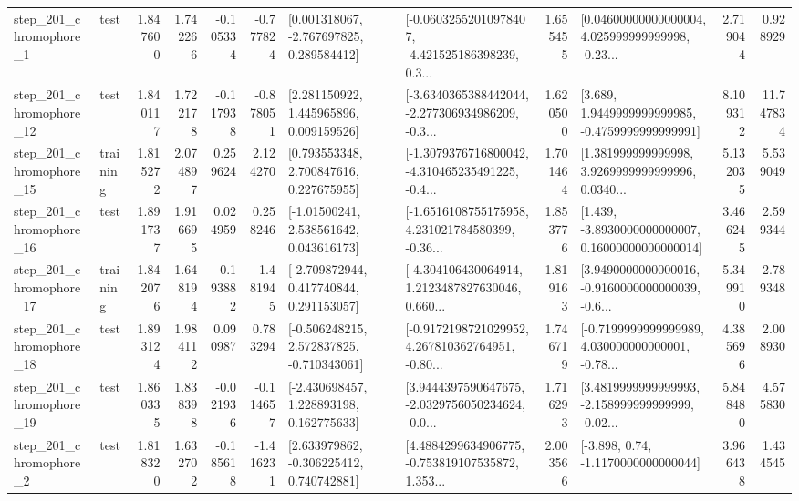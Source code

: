 \begin{tabular}{llrrrrllrlrr}
   step\_201\_chromophore\_1 &      test &      1.847600 &    1.742266 &     -0.105334 & -0.777824 &    [0.001318067, -2.767697825, 0.289584412] &  [-0.06032552010978407, -4.421525186398239, 0.3... &       1.655455 &  [0.04600000000000004, 4.025999999999998, -0.23... &            2.719044 &          0.928929 \\
  step\_201\_chromophore\_12 &      test &      1.840117 &    1.722178 &     -0.117938 & -0.878051 &     [2.281150922, 1.445965896, 0.009159526] &  [-3.6340365388442044, -2.277306934986209, -0.3... &       1.620500 &   [3.689, 1.9449999999999985, -0.4759999999999991] &            8.109312 &         11.747834 \\
  step\_201\_chromophore\_15 &  training &      1.815272 &    2.074897 &      0.259624 &  2.124270 &     [0.793553348, 2.700847616, 0.227675955] &  [-1.3079376716800042, -4.310465235491225, -0.4... &       1.701464 &  [1.381999999999998, 3.9269999999999996, 0.0340... &            5.132035 &          5.539049 \\
  step\_201\_chromophore\_16 &      test &      1.891737 &    1.916695 &      0.024959 &  0.258246 &     [-1.01500241, 2.538561642, 0.043616173] &  [-1.6516108755175958, 4.231021784580399, -0.36... &       1.853776 &  [1.439, -3.8930000000000007, 0.16000000000000014] &            3.466245 &          2.599344 \\
  step\_201\_chromophore\_17 &  training &      1.842076 &    1.648194 &     -0.193882 & -1.481945 &    [-2.709872944, 0.417740844, 0.291153057] &  [-4.304106430064914, 1.2123487827630046, 0.660... &       1.819163 &  [3.9490000000000016, -0.9160000000000039, -0.6... &            5.349910 &          2.789348 \\
  step\_201\_chromophore\_18 &      test &      1.893124 &    1.984112 &      0.090987 &  0.783294 &   [-0.506248215, 2.572837825, -0.710343061] &  [-0.9172198721029952, 4.267810362764951, -0.80... &       1.746719 &  [-0.7199999999999989, 4.030000000000001, -0.78... &            4.385696 &          2.008930 \\
  step\_201\_chromophore\_19 &      test &      1.860335 &    1.838398 &     -0.021936 & -0.114657 &    [-2.430698457, 1.228893198, 0.162775633] &  [3.9444397590647675, -2.0329756050234624, -0.0... &       1.716293 &  [3.4819999999999993, -2.158999999999999, -0.02... &            5.848480 &          4.575830 \\
   step\_201\_chromophore\_2 &      test &      1.818320 &    1.632702 &     -0.185618 & -1.416231 &    [2.633979862, -0.306225412, 0.740742881] &  [4.4884299634906775, -0.753819107535872, 1.353... &       2.003566 &                [-3.898, 0.74, -1.1170000000000044] &            3.966438 &          1.434545 \\

\end{tabular}
